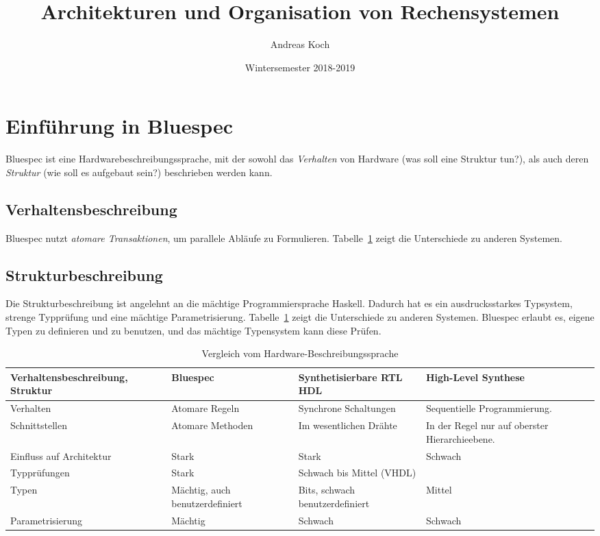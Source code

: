 \documentclass[ngerman]{scrartcl}
\title{Architekturen und Organisation von Rechensystemen}
\date{Wintersemester 2018-2019}
\author{Andreas Koch}
\newcommand{\tablespacing}[1]{\renewcommand{\arraystretch}{#1}}
\begin{document}
\maketitle
\tableofcontents
\newpage

\section{Einführung in Bluespec}

Bluespec ist eine Hardwarebeschreibungssprache, mit der sowohl das \emph{Verhalten} von Hardware (was soll eine Struktur tun?), als auch deren \emph{Struktur} (wie soll es aufgebaut sein?) beschrieben werden kann. 

\subsection{Verhaltensbeschreibung}

Bluespec nutzt \emph{atomare Transaktionen}, um parallele Abläufe zu Formulieren. Tabelle~\ref{tbl:bsvvergleich} zeigt die Unterschiede zu anderen Systemen.

\subsection{Strukturbeschreibung}

Die Strukturbeschreibung ist angelehnt an die mächtige Programmiersprache Haskell. Dadurch hat es ein ausdrucksstarkes Typsystem, strenge Typprüfung und eine mächtige Parametrisierung. Tabelle~\ref{tbl:bsvvergleich} zeigt die Unterschiede zu anderen Systemen. Bluespec erlaubt es, eigene Typen zu definieren und zu benutzen, und das mächtige Typensystem kann diese Prüfen.

\begin{table}\small\centering\tablespacing{1.3}
\begin{tabular}{@{}p{2.5cm}p{3cm}p{4cm}p{4cm}@{}}
\toprule
\textbf{Verhaltens\-beschreibung, Struktur} & \textbf{Bluespec} & \textbf{Synthetisierbare RTL HDL} & \textbf{High-Level Synthese}\\
\midrule 
Verhalten & Atomare Regeln & Synchrone Schaltungen & Sequentielle Programmierung.\\
Schnittstellen & Atomare Methoden & Im wesentlichen Drähte & In der Regel nur auf oberster Hierarchieebene.\\
Einfluss auf Architektur & Stark & Stark & Schwach\\
Typprüfungen & Stark & Schwach bis Mittel (VHDL)\\
Typen & Mächtig, auch benutzerdefiniert & Bits, schwach benutzerdefiniert & Mittel\\
Parametrisierung & Mächtig & Schwach & Schwach\\
\bottomrule
\end{tabular}
\caption{Vergleich vom Hardware-Beschreibungssprache}\label{tbl:bsvvergleich}
\end{table}
\end{document}
